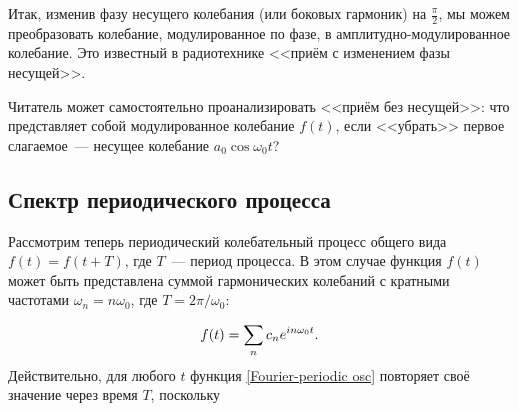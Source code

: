 
%

Итак, изменив фазу несущего колебания (или боковых гармоник) на  $\frac{\pi}{2}$, мы можем преобразовать колебание,
модулированное по фазе, в амплитудно-модулированное колебание. Это известный в радиотехнике <<приём с изменением фазы несущей>>.

Читатель может самостоятельно проанализировать <<приём без несущей>>: что представляет собой модулированное колебание
$f(t)$, если <<убрать>> первое слагаемое~--- несущее колебание $a_0\cos\omega_0t$?

\subsection{Спектр периодического процесса}

Рассмотрим теперь периодический колебательный процесс общего вида $f(t)=f(t+T)$, где $T$~--- период процесса. В этом
случае функция $f(t)$ может быть представлена суммой гармонических колебаний с кратными частотами $\omega_n=n\omega_0$,
где $T=2\pi/\omega_0$:

\begin{equation}
	\eqmark{Fourier-periodic osc}
	f(t)=\sum_n c_n e^{in\omega_0 t}.
\end{equation}
Действительно, для любого $t$ функция \eqref{Fourier-periodic osc} повторяет своё значение через время $T$, поскольку

